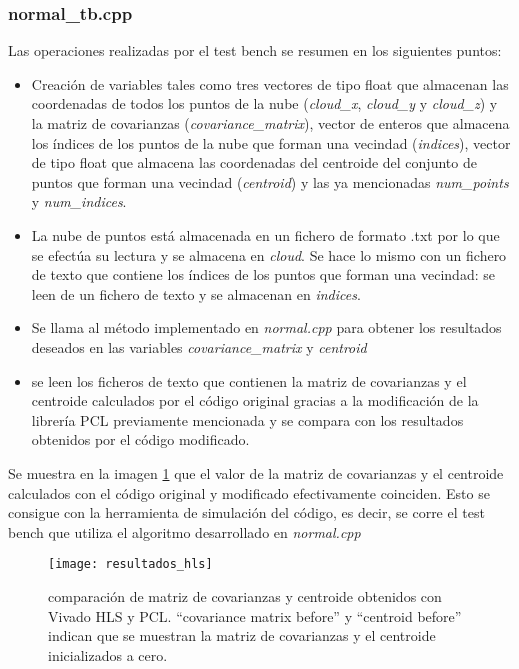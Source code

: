 \subsubsection{normal\_tb.cpp}
Las operaciones realizadas por el test bench se resumen en los siguientes puntos:

\begin{itemize}
\item Creación de variables tales como tres vectores de tipo float que almacenan las coordenadas de todos los puntos de la nube (\textit{cloud\_x}, \textit{cloud\_y} y \textit{cloud\_z}) y la matriz de covarianzas (\textit{covariance\_matrix}), vector de enteros que almacena los índices de los puntos de la nube que forman una vecindad (\textit{indices}), vector de tipo float que almacena las coordenadas del centroide del conjunto de puntos que forman una vecindad (\textit{centroid}) y las ya mencionadas \textit{num\_points} y \textit{num\_indices}.

\item La nube de puntos está almacenada en un fichero de formato .txt por lo que se efectúa su lectura y se almacena en \textit{cloud}. Se hace lo mismo con un fichero de texto que contiene los índices de los puntos que forman una vecindad: se leen de un fichero de texto y se almacenan en \textit{indices}.

\item Se llama al método implementado en \textit{normal.cpp} para obtener los resultados deseados en las variables \textit{covariance\_matrix} y \textit{centroid}

\item se leen los ficheros de texto que contienen la matriz de covarianzas y el centroide calculados por el código original gracias a la modificación de la librería PCL previamente mencionada y se compara con los resultados obtenidos por el código modificado.
\end{itemize}

Se muestra en la imagen \ref{fig:resultados_hls} que el valor de la matriz de covarianzas y el centroide calculados con el código original y modificado efectivamente coinciden. Esto se consigue con la herramienta de simulación del código, es decir, se corre el test bench que utiliza el algoritmo desarrollado en \textit{normal.cpp}

\begin{figure}
\centering
\texttt{[image: resultados\_hls]}
\caption{comparación de matriz de covarianzas y centroide obtenidos con Vivado HLS y PCL. ``covariance matrix before'' y ``centroid before'' indican que se muestran la matriz de covarianzas y el centroide inicializados a cero.}\label{fig:resultados_hls}
\end{figure}

